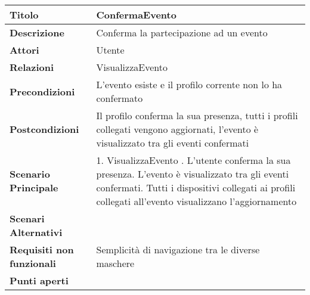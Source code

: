 \begin{tabular} {|P{4.5cm}|P{12.5cm}|}
  \hline
  \textbf{Titolo}                   & ConfermaEvento                                                                                                                       \\
  \hline
  \textbf{Descrizione}              & Conferma la partecipazione ad un evento                                                                                              \\
  \hline
  \textbf{Attori}                   & Utente                                                                                                                               \\
  \hline
  \textbf{Relazioni}                & VisualizzaEvento                                                                                                                     \\
  \hline
  \textbf{Precondizioni}            & L'evento esiste e il profilo corrente non lo ha confermato                                                                           \\
  \hline
  \textbf{Postcondizioni}           & Il profilo conferma la sua presenza, tutti i profili collegati vengono aggiornati, l'evento è visualizzato tra gli eventi confermati \\
  \hline
  \textbf{Scenario Principale}      & 1. VisualizzaEvento . L'utente conferma la sua presenza. L'evento è visualizzato tra gli eventi confermati. Tutti i dispositivi collegati ai profili collegati all'evento visualizzano l'aggiornamento                                                                            \\
  \textbf{Scenari Alternativi}      &                                                                                                                                      \\
  \hline
  \textbf{Requisiti non funzionali} & Semplicità di navigazione tra le diverse maschere                                                                                    \\
  \hline
  \textbf{Punti aperti}             &                                                                                                                                      \\
  \hline
\end{tabular}
\hfill
\break

